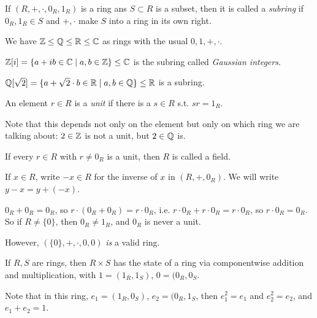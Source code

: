 \documentclass[a4paper]{article}
\begin{document}
\begin{defi}
If $(R,+,\cdot,0_R,1_R)$ is a ring ans $S \subset R$ is a subset, then it is called a \emph{subring} if $0_R,1_R \in S$ and $+,\cdot$ make $S$ into a ring in its own right.
\end{defi}

\begin{eg}
We have $\mathbb{Z} \leq \mathbb{Q} \leq \mathbb{R} \leq \mathbb{C}$ as rings with the usual $0,1,+,\cdot$.
\end{eg}

\begin{eg}
$\mathbb{Z}[i] = \{a+ib\in \mathbb{C} \mid a,b \in \mathbb{Z}\} \leq \mathbb{C}$ is the subring called \emph{Gaussian integers}. 
\end{eg}

\begin{eg}
$\mathbb{Q}[\sqrt{2}] = \{ a+\sqrt{2} \cdot b \in \mathbb{R} \mid a,b \in \mathbb{Q} \} \leq \mathbb{R}$ is a subring.
\end{eg}

\begin{defi}
An element $r \in R$ is a \emph{unit} if there is a $s \in R$ s.t. $sr = 1_R$.

Note that this depends not only on the element but only on which ring we are talking about: $2 \in \mathbb{Z}$ is not a unit, but $2 \in \mathbb{Q}$ is.

If every $r \in R$ with $r \neq 0_R$ is a unit, then $R$ is called a field.
\end{defi}

\begin{notation}
If $x \in R$, write $-x \in R$ for the inverse of $x$ in $(R,+,0_R)$. We will write $y-x = y+(-x)$.
\end{notation}

\begin{eg}
$0_R+0_R = 0_R$, so $r \cdot (0_R+0_R) = r\cdot 0_R$, i.e. $r\cdot 0_R + r\cdot 0_R = r\cdot 0_R$, so $r\cdot 0_R = 0_R$. So if $R \neq \{0\}$, then $0_R \neq 1_R$, and $0_R$ is never a unit.

However, $(\{0\},+,\cdot,0,0)$ \emph{is} a valid ring.
\end{eg}

\begin{eg}
If $R,S$ are rings, then $R \times S$ has the state of a ring via componentwise addition and multiplication, with $1=(1_R,1_S)$, $0 =(0_R,0_S$.

Note that in this ring, $e_1 = (1_R,0_S)$, $e_2 = (0_R,1_S$, then $e_1^2 =e_1$ and $e_2^2 = e_2$, and $e_1+e_2 = 1$.
\end{eg}
\end{document}
